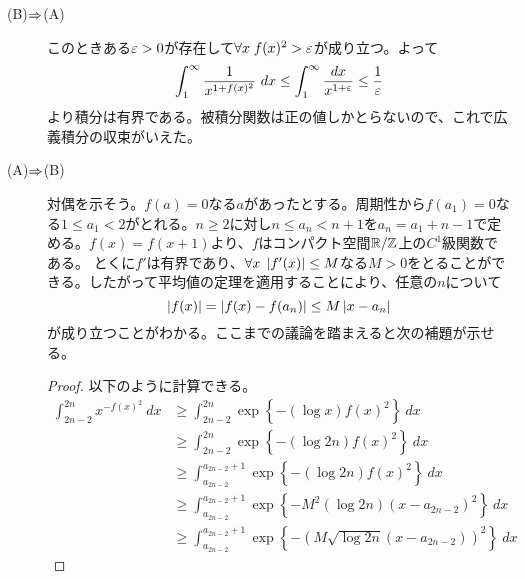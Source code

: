 \begin{sol} ${}$
  \begin{description}
    \item[(B)$\Rightarrow$(A)] このときある${\varepsilon} > 0$が存在して$\forall x \; f(x)^2 > {\varepsilon}$が成り立つ。よって
    \begin{align*}
            \int_1^{\infty} \frac{1}{x^{1+f(x)^2}} \ dx \leq \int_1^{\infty} \frac{dx}{x^{1+{\varepsilon}}}
            \leq \frac{1}{{\varepsilon}}
    \end{align*}
    より積分は有界である。被積分関数は正の値しかとらないので、これで広義積分の収束がいえた。
    \item[(A)$\Rightarrow$(B)] 対偶を示そう。$f(a)=0$なる$a$があったとする。周期性から$f(a_1)=0$なる$1 \leq a_1 < 2$がとれる。$n \geq 2$に対し$ n \leq a_n < n+1$を$a_n = a_1 + n-1$で定める。$f(x)=f(x+1)$より、$f$はコンパクト空間${\mathbb R} / {\mathbb Z}$上の$C^1$級関数である。
    とくに$f'$は有界であり、$\forall x \; \left \lvert f'(x) \right \rvert \leq M$なる$M > 0$をとることができる。したがって平均値の定理を適用することにより、任意の$n$について
    \[
    \left \lvert f(x) \right \rvert = \left \lvert f(x) - f(a_n) \right \rvert \leq M \left \lvert x - a_n \right \rvert
    \]
    が成り立つことがわかる。ここまでの議論を踏まえると次の補題が示せる。
\begin{proof}
  以下のように計算できる。
  \begin{align*}
    \int_{2n-2}^{2n} x^{-f(x)^2} \ dx  &\geq \int_{2n-2}^{2n} \exp \left\{ - (\log x) f(x)^2 \right\} \ dx \\
    &\geq  \int_{2n-2}^{2n} \exp \left\{ - (\log 2n) f(x)^2 \right\} \ dx \\
　　&\geq　\int_{a_{2n-2}}^{a_{2n-2}+1} \exp \left\{ - (\log 2n) f(x)^2 \right\} \ dx \\
　　&\geq  \int_{a_{2n-2}}^{a_{2n-2}+1} \exp \left\{ - M^2(\log 2n) (x-a_{2n-2})^2 \right\} \ dx \\
　　&\geq  \int_{a_{2n-2}}^{a_{2n-2}+1} \exp \left\{ - (M \sqrt{\log 2n} (x-a_{2n-2}) )^2 \right\} \ dx

\end{align*}
\end{proof}
\end{description}
\end{sol}
